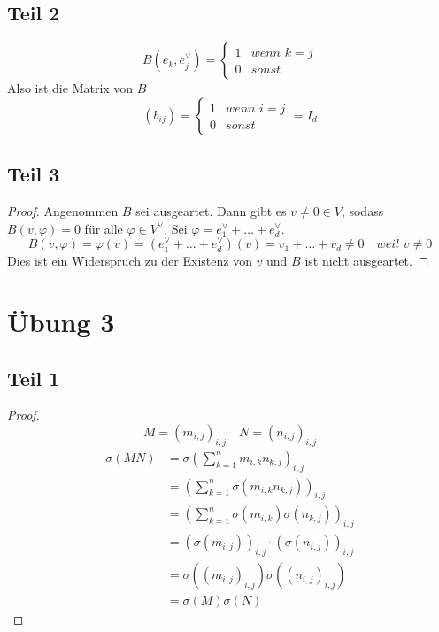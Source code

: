 \documentclass[10pt,a4paper]{article}
\begin{document}
\subsection*{Teil 2}

\begin{equation}
B(e_{k}, e_{j}^{\vee}) = \begin{cases}
1 & \textit{wenn $k = j$}\\
0 & \textit{sonst}
\end{cases}
\end{equation}
Also ist die Matrix von $B$
\begin{equation}
(b_{ij}) = \begin{cases}
1 & \textit{wenn $i = j$}\\
0 & \textit{sonst}
\end{cases}
= I_{d}
\end{equation}

\subsection*{Teil 3}

\begin{proof}
Angenommen $B$ sei ausgeartet.
Dann gibt es $v \ne 0 \in V$, sodass $B(v, \varphi) = 0$ für alle $\varphi \in V^{\vee}$.
Sei $\varphi = e_{1}^{\vee} + \dots + e_{d}^{\vee}$.
\begin{equation}
B(v, \varphi) = \varphi(v) = (e_{1}^{\vee} + \dots + e_{d}^{\vee})(v) = v_{1} + \dots + v_{d} \ne 0 \quad \textit{weil $v \ne 0$}
\end{equation}
Dies ist ein Widerspruch zu der Existenz von $v$ und $B$ ist nicht ausgeartet.
\end{proof}

\section*{Übung 3}

\subsection*{Teil 1}

\begin{proof}
\begin{equation}
M = (m_{i,j})_{i,j} \quad N = (n_{i,j})_{i,j}
\end{equation}
\begin{align*}
\sigma(MN) & = \sigma\left( \sum_{k = 1}^{n} m_{i,k}n_{k,j} \right)_{i,j}\\
& = \left( \sum_{k = 1}^{n} \sigma(m_{i,k}n_{k,j}) \right)_{i,j}\\
& = \left( \sum_{k = 1}^{n} \sigma(m_{i,k})\sigma(n_{k,j}) \right)_{i,j}\\
& = (\sigma(m_{i,j}))_{i,j} \cdot (\sigma(n_{i,j}))_{i,j}\\
& = \sigma((m_{i,j})_{i,j})\sigma((n_{i,j})_{i,j})\\
& = \sigma(M)\sigma(N)
\end{align*}
\end{proof}
\end{document}
